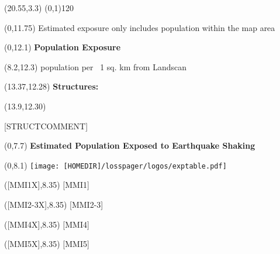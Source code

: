 \documentclass[6pt]{article}
\begin{document}
\begin{textblock}{1}(20.55,3.3)
\line(0,1){120}
\end{textblock}

\begin{textblock}{10}(0,11.75)
{\footnotesize *Estimated exposure only includes population within the map area}
\end{textblock}

\begin{textblock}{7.5}(0,12.1)
\fontsize{14}{16.8}\textbf{Population Exposure}
\end{textblock}

\begin{textblock}{7.5}(8.2,12.3)
{\footnotesize population per ~1 sq. km from Landscan}
\end{textblock}
\begin{textblock}{7.5}(13.37,12.28)
\fontsize{9}{16.8}\textbf{Structures:}
\end{textblock}

\begin{textblock}{6.5}(13.9,12.30)
\begin{spacing}{0.85}
\begin{flushleft}
{\small [STRUCTCOMMENT]}
\end{flushleft}
\end{spacing}
\end{textblock}

\begin{textblock}{17}(0,7.7)
\fontsize{14}{16.8}\textbf{Estimated Population Exposed to Earthquake Shaking}
\end{textblock}

\begin{textblock}{20}(0,8.1)
\texttt{[image: [HOMEDIR]/losspager/logos/exptable.pdf]}
\end{textblock}

\begin{textblock}{1.5}([MMI1X],8.35)
  [MMI1]
\end{textblock}

\begin{textblock}{1.5}([MMI2-3X],8.35)
  [MMI2-3]
\end{textblock}

\begin{textblock}{1.5}([MMI4X],8.35)
  [MMI4]
\end{textblock}

\begin{textblock}{1.5}([MMI5X],8.35)
  [MMI5]
\end{textblock}
\end{document}

